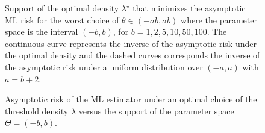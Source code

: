 \documentclass[letterpaper, conference]{IEEEtran}      %
\begin{document}
\begin{figure}
\begin{center}
\begin{tikzpicture}
\end{tikzpicture}
\caption{\label{fig:minimax_support}
Support of the optimal density $\lambda^\star$ that minimizes the asymptotic ML risk for the worst choice of $\theta \in (-\sigma b, \sigma b)$ where the parameter space is the interval $(-b,b)$, for $b=1,2,5,10,50,100$. The continuous curve represents the inverse of the asymptotic risk under the optimal density and the dashed curves corresponds the inverse of the asymptotic risk under a uniform distribution over $(-a,a)$ with $a = b+2$. 
}
\end{center}
\end{figure}

\begin{figure}
\begin{center}
\caption{\label{fig:minimax_optval}
Asymptotic risk of the ML estimator under an optimal choice of the threshold density $\lambda$ versus the support of the parameter space $\Theta = (-b,b)$.
}
\end{center}
\end{figure}
\end{document}
